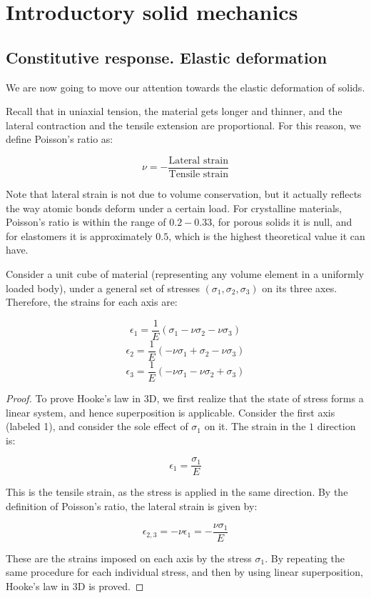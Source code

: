 \documentclass{article}
\begin{document}
\newpage

\section{Introductory solid mechanics}

\subsection{Constitutive response. Elastic deformation}

We are now going to move our attention towards the elastic deformation of solids.

\begin{definition}
    Recall that in uniaxial tension, the material gets longer and thinner, and the lateral contraction and the tensile extension are proportional. For this reason, we define Poisson's ratio as:

    \[ \nu = -\frac{\text{Lateral strain}}{\text{Tensile strain}} \]
\end{definition}

Note that lateral strain is not due to volume conservation, but it actually reflects the way atomic bonds deform under a certain load. For crystalline materials, Poisson's ratio is within the range of $0.2 - 0.33$, for porous solids it is null, and for elastomers it is approximately $0.5$, which is the highest theoretical value it can have.

\begin{proposition}
    Consider a unit cube of material (representing any volume element in a uniformly loaded body), under a general set of stresses $(\sigma_1, \sigma_2, \sigma_3)$ on its three axes. Therefore, the strains for each axis are:

    \[ \epsilon_1 = \frac{1}{E}(\sigma_1 - \nu\sigma_2 - \nu\sigma_3) \]
    \[ \epsilon_2 = \frac{1}{E}(-\nu\sigma_1 + \sigma_2 -\nu\sigma_3) \]
    \[ \epsilon_3 = \frac{1}{E}(-\nu\sigma_1 -\nu\sigma_2 + \sigma_3) \]
\end{proposition}

\begin{proof}
    To prove Hooke's law in 3D, we first realize that the state of stress forms a linear system, and hence superposition is applicable. Consider the first axis (labeled 1), and consider the sole effect of $\sigma_1$ on it. The strain in the $1$ direction is:

    \[ \epsilon_1 = \frac{\sigma_1}{E} \]

    This is the tensile strain, as the stress is applied in the same direction. By the definition of Poisson's ratio, the lateral strain is given by:

    \[ \epsilon_{2,3} = -\nu\epsilon_1 = -\frac{\nu\sigma_1}{E} \]

    These are the strains imposed on each axis by the stress $\sigma_1$. By repeating the same procedure for each individual stress, and then by using linear superposition, Hooke's law in 3D is proved.
\end{proof}
\end{document}

